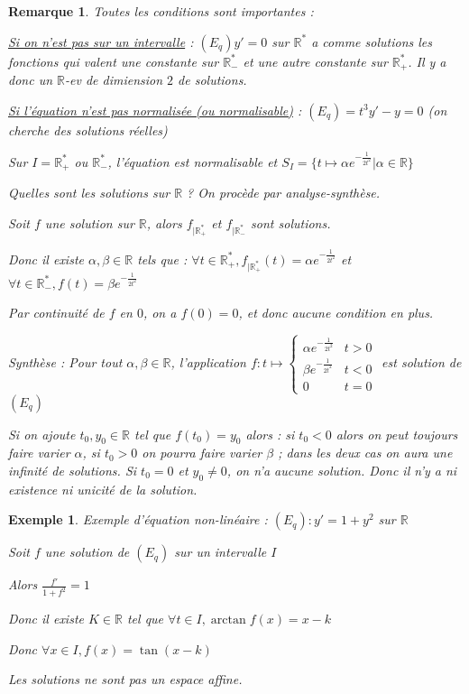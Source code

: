 \documentclass[a4paper,12pt]{book}
\newtheorem{Exe}{Exemple}[section]
\newtheorem{Rem}{Remarque}[section]
\def\R{\mathbb{R}}
\begin{document}
\begin{Rem}
Toutes les conditions sont importantes :
\par \underline{Si on n'est pas sur un intervalle} : $(E_q) y'=0$ sur $\R^*$ a comme solutions les fonctions qui valent une constante sur $\R_-^*$ et une autre constante sur $\R_+^*$. Il y a donc un $\R$-ev de dimiension $2$ de solutions.
\par \underline{Si l'équation n'est pas normalisée (ou normalisable)} : $(E_q) = t^3y'-y=0$ (on cherche des solutions réelles)
\par Sur $I=\R_+^*$ ou $\R_-^*$, l'équation est normalisable et $S_I = \{t\mapsto \alpha e^{-\frac{1}{2t^2}}\vert \alpha\in\R\}$
\par Quelles sont les solutions sur $\R$ ? On procède par analyse-synthèse.
\par Soit $f$ une solution sur $\R$, alors $f_{\vert\R_+^*}$ et $f_{\vert\R_-^*}$ sont solutions.
\par Donc il existe $\alpha, \beta\in\R$ tels que : $\forall t\in\R_+^*, f_{\vert\R_+^*}(t) =\alpha e^{-\frac{1}{2t^2}}$ et $\forall t\in\R_-^*, f(t) = \beta e^{-\frac{1}{2t^2}}$
\par Par continuité de $f$ en $0$, on a $f(0)=0$, et donc aucune condition en plus.
\par Synthèse : Pour tout $\alpha, \beta\in\R$, l'application $f:t\mapsto \left\{\begin{array}{rl}\alpha e^{-\frac{1}{2t^2}} & t>0 \\ \beta e^{-\frac{1}{2t^2}} & t<0 \\ 0 & t=0 \end{array}\right.$ est solution de $(E_q)$
\par Si on ajoute $t_0, y_0\in\R$ tel que $f(t_0)=y_0$ alors : si $t_0<0$ alors on peut toujours faire varier $\alpha$, si $t_0>0$ on pourra faire varier $\beta$ ; dans les deux cas on aura une infinité de solutions. Si $t_0=0$ et $y_0\neq 0$, on n'a aucune solution. Donc il n'y a ni existence ni unicité de la solution.
\end{Rem}
\begin{Exe}
Exemple d'équation non-linéaire : $(E_q) : y' = 1+y^2$ sur $\R$
\par Soit $f$ une solution de $(E_q)$ sur un intervalle $I$
\par Alors $\frac{f'}{1+f^2}=1$
\par Donc il existe $K\in\R$ tel que $\forall t\in I, \arctan f(x) = x-k$
\par Donc $\forall x\in I, f(x) =\tan (x-k)$
\par Les solutions ne sont pas un espace affine.
\end{Exe}
\end{document}
